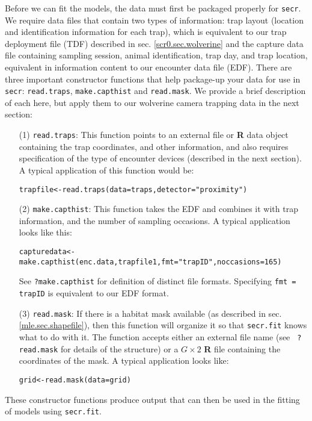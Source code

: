 Before we can fit the models, the data must first be packaged properly
for 
\mbox{\tt secr}.  
We require data files that contain two types of information:
trap layout (location and
identification information for each trap), which is equivalent to our
trap deployment file (TDF) described in sec. \ref{scr0.sec.wolverine}
and the capture data file containing 
sampling session, animal identification, trap day, and trap
location,  equivalent in information content to our encounter data file (EDF).
There are three important constructor functions that help package-up
your 
data for use in \mbox{\tt secr}:
\mbox{\tt read.traps},
\mbox{\tt make.capthist} and
\mbox{\tt read.mask}. 
We provide a brief description of each here, but apply them to our
wolverine camera trapping data in the next section:
\begin{itemize}
\item[(1)] 
\mbox{\tt read.traps}: This function points to an external file or
{\bf R} data object containing the trap coordinates, and other
information, and also requires specification of the type of encounter
devices (described in the next section). A typical application of this
function would be:
\begin{verbatim}
trapfile<-read.traps(data=traps,detector="proximity")
\end{verbatim}

\item[(2)] \mbox{\tt make.capthist}: This function takes the EDF and combines it
with trap information, and the number of sampling occasions. A typical
application looks like this:
\begin{verbatim}
capturedata<-make.capthist(enc.data,trapfile1,fmt="trapID",noccasions=165)
\end{verbatim}
See \mbox{\tt ?make.capthist} for definition of distinct file
formats. Specifying  \mbox{\tt fmt = trapID}  is equivalent to our EDF format.
\item[(3)] \mbox{\tt read.mask}: If there is a habitat mask
  available 
(as described in sec. \ref{mle.sec.shapefile}), then this function
will organize it so that \mbox{\tt secr.fit} knows what to do with it.
The function accepts either an external file name (see \mbox{\tt
  ?read.mask} for details of the structure) or a $G\times 2$ {\bf R} file
containing the coordinates of the mask. A typical application looks
like:
\begin{verbatim}
grid<-read.mask(data=grid)
\end{verbatim}
\end{itemize}
These constructor functions produce output that can then be used in
the fitting of models using \mbox{\tt secr.fit}.

